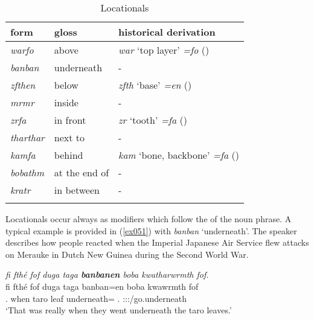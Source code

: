 \begin{table}
\caption{Locationals}
\label{locationals-table}
	\begin{tabularx}{.8\textwidth}{XXl}
		\lsptoprule
		form&{gloss}&{historical derivation}\\ \midrule
		\emph{warfo}&above&\emph{war} `top layer' \emph{=fo} ({\All})\\
		\emph{banban}&underneath&-\\
		\emph{zfthen}&below&\emph{zfth} `base' \emph{=en} ({\Loc})\\
		\emph{mrmr}&inside&-\\
		\emph{zrfa}&in front&\emph{zr} `tooth' \emph{=fa} ({\Abl})\\
		\emph{tharthar}&next to&-\\
		\emph{kamfa}&behind&\emph{kam} `bone, backbone' \emph{=fa} ({\Abl})\\
		\emph{bobathm}&at the end of&-\\
		\emph{kratr}&in between&-\\
		\lspbottomrule
	\end{tabularx}
\end{table}%

Locationals occur always as modifiers which follow the  of the noun phrase. A typical example is provided in (\ref{ex051}) with \emph{banban} `underneath'. The speaker describes how people reacted when the Imperial Japanese Air Service flew attacks on Merauke in Dutch New Guinea during the Second World War.

\newpage 
\begin{exe}
	\ex \emph{fi fthé fof duga taga \textbf{banbanen} boba kwatharwrmth fof.}\\
	\gll fi fthé fof duga taga banban=en boba kwawrmth fof\\
	\Tsg.{\Abs} when {\Emph} taro leaf underneath={\Loc} \Med.{\Abl} \Stpl:\Sbj:\Pst:\Dur/go.underneath {\Emph}\\
	\trans `That was really when they went underneath the taro leaves.'\\ 
	\label{ex051}
\end{exe}

